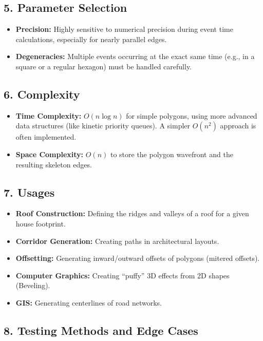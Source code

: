 \subsection{5. Parameter Selection}

\begin{itemize}
    \item \textbf{Precision:} Highly sensitive to numerical precision during event time calculations, especially for nearly parallel edges.
    \item \textbf{Degeneracies:} Multiple events occurring at the exact same time (e.g., in a square or a regular hexagon) must be handled carefully.
\end{itemize}

\subsection{6. Complexity}

\begin{itemize}
    \item \textbf{Time Complexity:} $O(n \log n)$ for simple polygons, using more advanced data structures (like kinetic priority queues). A simpler $O(n^2)$ approach is often implemented.
    \item \textbf{Space Complexity:} $O(n)$ to store the polygon wavefront and the resulting skeleton edges.
\end{itemize}

\subsection{7. Usages}

\begin{itemize}
    \item \textbf{Roof Construction:} Defining the ridges and valleys of a roof for a given house footprint.
    \item \textbf{Corridor Generation:} Creating paths in architectural layouts.
    \item \textbf{Offsetting:} Generating inward/outward offsets of polygons (mitered offsets).
    \item \textbf{Computer Graphics:} Creating ``puffy'' 3D effects from 2D shapes (Beveling).
    \item \textbf{GIS:} Generating centerlines of road networks.
\end{itemize}

\subsection{8. Testing Methods and Edge Cases}

